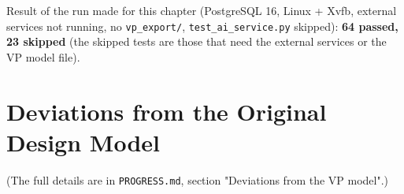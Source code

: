 Result of the run made for this chapter (PostgreSQL 16, Linux + Xvfb,
external services not running, no \texttt{vp\_\allowbreak{}export/\allowbreak{}},
\texttt{test\_\allowbreak{}ai\_\allowbreak{}service.\allowbreak{}py} skipped): \textbf{64 passed, 23 skipped}
(the skipped tests are those that need the external services or the VP
model file).

\hypertarget{deviations-from-the-original-design-model}{%
\section{Deviations from the Original Design
Model}\label{deviations-from-the-original-design-model}}

(The full details are in \texttt{PROGRESS.\allowbreak{}md}, section "Deviations from
the VP model".)


